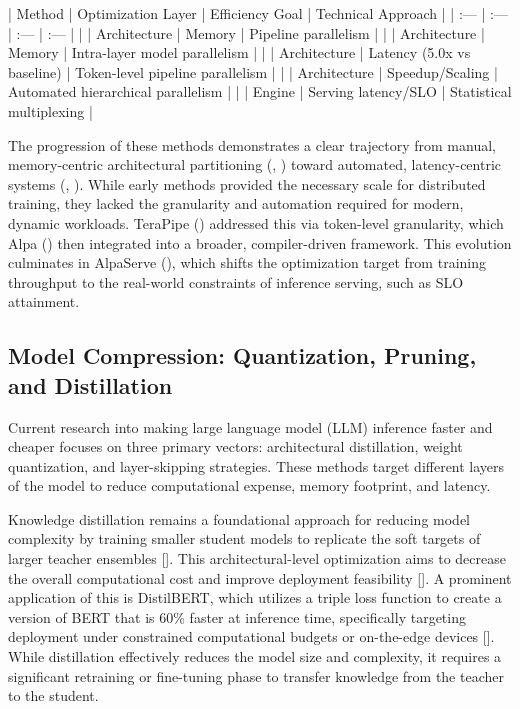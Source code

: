 \documentclass[11pt]{article}
\begin{document}
| Method | Optimization Layer | Efficiency Goal | Technical Approach |
| :--- | :--- | :--- | :--- |
| \citep{1811.06965} | Architecture | Memory | Pipeline parallelism |
| \citep{1909.08053} | Architecture | Memory | Intra-layer model parallelism |
| \citep{2102.07988} | Architecture | Latency (5.0x vs baseline) | Token-level pipeline parallelism |
| \citep{2201.12023} | Architecture | Speedup/Scaling | Automated hierarchical parallelism |
| \citep{2302.11665} | Engine | Serving latency/SLO | Statistical multiplexing |

The progression of these methods demonstrates a clear trajectory from manual, memory-centric architectural partitioning (\citep{1811.06965}, \citep{1909.08053}) toward automated, latency-centric systems (\citep{2201.12023}, \citep{2302.11665}). While early methods provided the necessary scale for distributed training, they lacked the granularity and automation required for modern, dynamic workloads. TeraPipe (\citep{2102.07988}) addressed this via token-level granularity, which Alpa (\citep{2201.12023}) then integrated into a broader, compiler-driven framework. This evolution culminates in AlpaServe (\citep{2302.11665}), which shifts the optimization target from training throughput to the real-world constraints of inference serving, such as SLO attainment.

\subsection{Model Compression: Quantization, Pruning, and Distillation}

Current research into making large language model (LLM) inference faster and cheaper focuses on three primary vectors: architectural distillation, weight quantization, and layer-skipping strategies. These methods target different layers of the model to reduce computational expense, memory footprint, and latency.

Knowledge distillation remains a foundational approach for reducing model complexity by training smaller student models to replicate the soft targets of larger teacher ensembles [\citep{1503.02531}]. This architectural-level optimization aims to decrease the overall computational cost and improve deployment feasibility [\citep{1503.02531}]. A prominent application of this is DistilBERT, which utilizes a triple loss function to create a version of BERT that is 60\% faster at inference time, specifically targeting deployment under constrained computational budgets or on-the-edge devices [\citep{1910.01108}]. While distillation effectively reduces the model size and complexity, it requires a significant retraining or fine-tuning phase to transfer knowledge from the teacher to the student.
\end{document}
